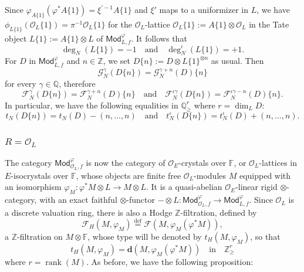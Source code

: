 \documentclass[11pt]{article}
\theoremstyle{definition}
\numberwithin{equation}{section}
\numberwithin{figure}{section}
\numberwithin{table}{section}
\newcommand{\Mod}{\mathsf{Mod}}
\DeclareMathOperator{\rank}{rank}
\newcommand{\eqd}{\stackrel{\mathrm{def}}{=}}
\begin{document}
Since $\varphi_{A\{1\}}(\varphi^{\ast}A\{1\})=\xi^{\prime-1}A\{1\}$ and $\xi'$ maps to a uniformizer in $L$, we have $\phi_{L\{1\}}(\mathcal{O}_{L}\{1\})=\pi^{-1}\mathcal{O}_{L}\{1\}$ for the $\mathcal{O}_{L}$-lattice $\mathcal{O}_{L}\{1\}:=A\{1\}\otimes\mathcal{O}_{L}$ in the Tate object $L\{1\}:=A\{1\}\otimes L$ of $\Mod_{L,f}^{\varphi}$. It follows that
\[
\deg_{N}(L\{1\})=-1\quad\text{and}\quad\deg_{N}^{\iota}(L\{1\})=+1.
\]
For $D$ in $\Mod_{L,f}^{\varphi}$ and $n\in\mathbb{Z}$, we set $D\{n\}:=D\otimes L\{1\}^{\otimes n}$ as usual. Then
\[
\mathcal{G}_{N}^{\gamma}(D\{n\})=\mathcal{G}_{N}^{\gamma+n}(D)\{n\}
\]
for every $\gamma\in\mathbb{Q}$, therefore
\[
\mathcal{F}_{N}^{\gamma}(D\{n\})=\mathcal{F}_{N}^{\gamma+n}(D)\{n\}\quad\text{and}\quad\mathcal{F}_{N}^{\iota\gamma}(D\{n\})=\mathcal{F}_{N}^{\iota\gamma-n}(D)\{n\}.
\]
In particular, we have the following equalities in $\mathbb{Q}_{\geq}^{r}$ where $r=\dim_{L}D$:
\[
t_{N}(D\{n\})=t_{N}(D)-(n,\dots,n)\quad\text{and}\quad t_{N}^{\iota}(D\{n\})=t_{N}^{\iota}(D)+(n,\dots,n).
\]

\subsubsection{\texorpdfstring{${R=\mathcal{O}_{L}}$}{R=OL}}\label{subsec:RisOL}

The category $\Mod_{\mathcal{O}_{L},f}^{\varphi}$ is now the category of $\mathcal{O}_{E}$-crystals over $\mathbb{F}$, or $\mathcal{O}_{L}$-lattices in $E$-isocrystals over $\mathbb{F}$, whose objects are finite free $\mathcal{O}_{L}$-modules $M$ equipped with an isomorphism $\varphi_{M}:\varphi^{\ast}M\otimes L\rightarrow M\otimes L$. It is a quasi-abelian $\mathcal{O}_{E}$-linear rigid $\otimes$-category, with an exact faithful $\otimes$-functor $-\otimes L:\Mod_{\mathcal{O}_{L},f}^{\varphi}\rightarrow\Mod_{L,f}^{\varphi}$. Since $\mathcal{O}_{L}$ is a discrete valuation ring, there is also a Hodge $\mathbb{Z}$-filtration, defined by
\[
\mathcal{F}_{H}(M,\varphi_{M})\eqd\mathcal{F}\left(M,\varphi_{M}(\varphi^{\ast}M)\right),
\]
a $\mathbb{Z}$-filtration on $M\otimes\mathbb{F}$, whose type will be denoted by $t_{H}(M,\varphi_{M})$, so that
\[
t_{H}(M,\varphi_{M})=\mathbf{d}\left(M,\varphi_{M}(\varphi^{\ast}M)\right)\quad\text{in}\quad\mathbb{Z}_{\geq}^{r}
\]
where $r=\rank(M)$. As before, we have the following proposition:
\end{document}
